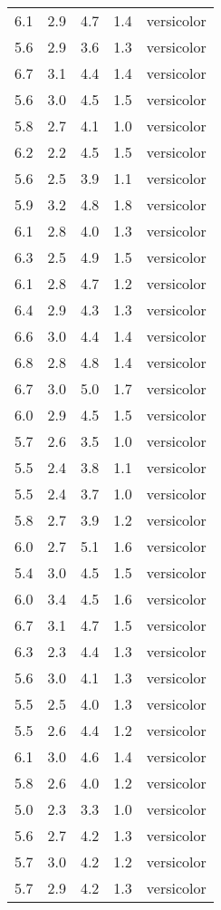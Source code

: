 \documentclass[
  letterpaper,
  DIV=11,
  numbers=noendperiod]{scrartcl}
\begin{document}
\begin{longtable}[]{@{}lrlrc@{}}
6.1 & 2.9 & 4.7 & 1.4 & versicolor \\
5.6 & 2.9 & 3.6 & 1.3 & versicolor \\
6.7 & 3.1 & 4.4 & 1.4 & versicolor \\
5.6 & 3.0 & 4.5 & 1.5 & versicolor \\
5.8 & 2.7 & 4.1 & 1.0 & versicolor \\
6.2 & 2.2 & 4.5 & 1.5 & versicolor \\
5.6 & 2.5 & 3.9 & 1.1 & versicolor \\
5.9 & 3.2 & 4.8 & 1.8 & versicolor \\
6.1 & 2.8 & 4.0 & 1.3 & versicolor \\
6.3 & 2.5 & 4.9 & 1.5 & versicolor \\
6.1 & 2.8 & 4.7 & 1.2 & versicolor \\
6.4 & 2.9 & 4.3 & 1.3 & versicolor \\
6.6 & 3.0 & 4.4 & 1.4 & versicolor \\
6.8 & 2.8 & 4.8 & 1.4 & versicolor \\
6.7 & 3.0 & 5.0 & 1.7 & versicolor \\
6.0 & 2.9 & 4.5 & 1.5 & versicolor \\
5.7 & 2.6 & 3.5 & 1.0 & versicolor \\
5.5 & 2.4 & 3.8 & 1.1 & versicolor \\
5.5 & 2.4 & 3.7 & 1.0 & versicolor \\
5.8 & 2.7 & 3.9 & 1.2 & versicolor \\
6.0 & 2.7 & 5.1 & 1.6 & versicolor \\
5.4 & 3.0 & 4.5 & 1.5 & versicolor \\
6.0 & 3.4 & 4.5 & 1.6 & versicolor \\
6.7 & 3.1 & 4.7 & 1.5 & versicolor \\
6.3 & 2.3 & 4.4 & 1.3 & versicolor \\
5.6 & 3.0 & 4.1 & 1.3 & versicolor \\
5.5 & 2.5 & 4.0 & 1.3 & versicolor \\
5.5 & 2.6 & 4.4 & 1.2 & versicolor \\
6.1 & 3.0 & 4.6 & 1.4 & versicolor \\
5.8 & 2.6 & 4.0 & 1.2 & versicolor \\
5.0 & 2.3 & 3.3 & 1.0 & versicolor \\
5.6 & 2.7 & 4.2 & 1.3 & versicolor \\
5.7 & 3.0 & 4.2 & 1.2 & versicolor \\
5.7 & 2.9 & 4.2 & 1.3 & versicolor \\

\end{longtable}
\end{document}
